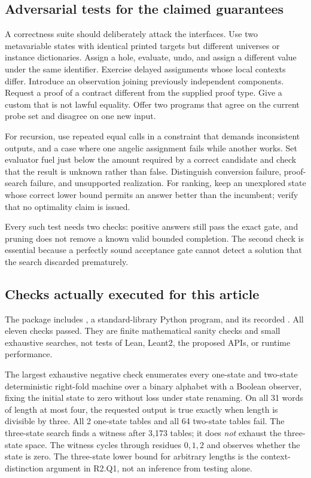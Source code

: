 \subsection{Adversarial tests for the claimed guarantees}

A correctness suite should deliberately attack the interfaces. Use two
metavariable states with identical printed targets but different universes or
instance dictionaries. Assign a hole, evaluate, undo, and assign a different
value under the same identifier. Exercise delayed assignments whose local
contexts differ. Introduce an observation joining previously independent
components. Request a proof of a contract different from the supplied proof
type. Give a custom  that is not lawful equality. Offer two programs
that agree on the current probe set and disagree on one new input.

For recursion, use repeated equal calls in a constraint that demands
inconsistent outputs, and a case where one angelic assignment fails while
another works. Set evaluator fuel just below the amount required by a correct
candidate and check that the result is unknown rather than false. Distinguish
conversion failure, proof-search failure, and unsupported realization. For
ranking, keep an unexplored state whose correct lower bound permits an answer
better than the incumbent; verify that no optimality claim is issued.

Every such test needs two checks: positive answers still pass the exact gate,
and pruning does not remove a known valid bounded completion. The second
check is essential because a perfectly sound acceptance gate cannot detect a
solution that the search discarded prematurely.

\subsection{Checks actually executed for this article}

The package includes , a standard-library Python
program, and its recorded . All eleven checks passed.
They are finite mathematical sanity checks and small exhaustive searches,
not tests of Lean, Leant2, the proposed APIs, or runtime performance.

The largest exhaustive negative check enumerates every one-state and
 two-state deterministic right-fold machine over a binary alphabet with a
Boolean observer, fixing the initial state to zero without loss under state
renaming. On all 31 words of length at most four, the requested output is true
exactly when length is divisible by three. All 2 one-state tables and all
64 two-state tables fail. The three-state search finds a witness after
3,173 tables; it does \emph{not} exhaust the three-state space. The witness
cycles through residues $0,1,2$ and observes whether the state is zero.
The three-state lower bound for arbitrary lengths is the context-distinction
argument in R2.Q1, not an inference from testing alone.

